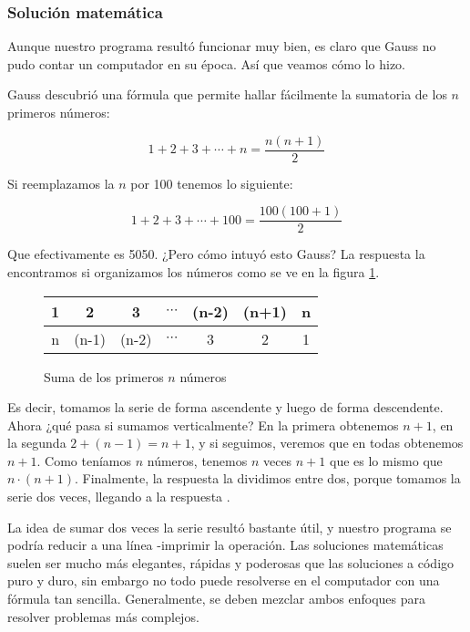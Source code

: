 \subsubsection{Solución matemática}

Aunque nuestro programa resultó funcionar muy bien, es claro que Gauss no pudo contar un computador en su época. Así que veamos cómo lo hizo.

Gauss descubrió una fórmula que permite hallar fácilmente la sumatoria de los $n$ primeros números:

\begin{equation}
1+2+3+\cdots+n = \frac{n(n+1)}{2}
\end{equation}

Si reemplazamos la $n$ por 100 tenemos lo siguiente:

\begin{equation}
1+2+3+\cdots+100 = \frac{100(100+1)}{2}
\end{equation}

Que efectivamente es 5050. ¿Pero cómo intuyó esto Gauss? La respuesta la encontramos si organizamos los números como se ve en la figura \ref{figgauss}.

\begin{figure}[h!]
\centering
\begin{tabular}{| c | c | c | c | c | c | c |}
\hline
1 & 2 & 3 & $\cdots$ & (n-2) & (n+1) & n \\ \hline
n & (n-1) & (n-2) & $\cdots$ & 3 & 2 & 1 \\ \hline
\end{tabular}
\caption{Suma de los primeros $n$ números}
\label{figgauss}
\end{figure}

Es decir, tomamos la serie de forma ascendente y luego de forma descendente. Ahora ¿qué pasa si sumamos verticalmente? En la primera obtenemos $n+1$, en la segunda $2+(n-1)=n+1$, y si seguimos, veremos que en todas obtenemos $n+1$. Como teníamos $n$ números, tenemos $n$ veces $n+1$ que es lo mismo que $n \cdot (n+1)$. Finalmente, la respuesta la dividimos entre dos, porque tomamos la serie dos veces, llegando a la respuesta \cite{graham1994concrete}.

La idea de sumar dos veces la serie resultó bastante útil, y nuestro programa se podría reducir a una línea -imprimir la operación. Las soluciones matemáticas suelen ser mucho más elegantes, rápidas y poderosas que las soluciones a código puro y duro, sin embargo no todo puede resolverse en el computador con una fórmula tan sencilla. Generalmente, se deben mezclar ambos enfoques para resolver problemas más complejos.



